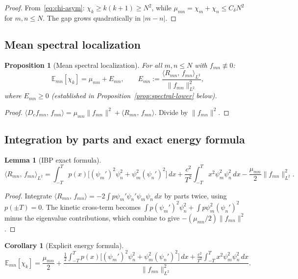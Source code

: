 \documentclass[12pt,a4paper]{amsart}
\newtheorem{lemma}[theorem]{Lemma}
\newtheorem{proposition}[theorem]{Proposition}
\newtheorem{corollary}[theorem]{Corollary}
\theoremstyle{definition}
\newcommand{\ip}[2]{\langle #1,\, #2\rangle}
\newcommand{\mumN}{\mu_{mn}}
\newcommand{\Emn}{\mathbb{E}_{mn}}
\begin{document}
\begin{proof}
From~\eqref{eq:chi-asym}: $\chi_k \ge k(k+1) \ge N^2$,
while $\mumN = \chi_m+\chi_n \le C_\delta N^2$ for $m,n \le N$.
The gap grows quadratically in $|m-n|$.
\end{proof}

\subsection{Mean spectral localization}

\begin{proposition}[Mean spectral localization]\label{prop:mean-loc}
For all $m,n \le N$ with $f_{mn}\not\equiv 0$:
\begin{equation}\label{eq:mean-loc}
  \Emn[\chi_k]
  = \mumN + E_{mn},
  \qquad
  E_{mn}
  := \frac{\ip{R_{mn}}{f_{mn}}_{L^2}}{\|f_{mn}\|_{L^2}^2},
\end{equation}
where $E_{mn} \ge 0$ (established in
Proposition~\ref{prop:spectral-lower} below).
\end{proposition}

\begin{proof}
$\ip{D_c f_{mn}}{f_{mn}} = \mumN\|f_{mn}\|^2 + \ip{R_{mn}}{f_{mn}}$.
Divide by $\|f_{mn}\|^2$.
\end{proof}

\subsection{Integration by parts and exact energy formula}

\begin{lemma}[IBP exact formula]\label{lem:ibp-exact}
\begin{equation}\label{eq:ibp-exact}
  \ip{R_{mn}}{f_{mn}}_{L^2}
  = \int_{-T}^T p(x)\bigl[(\psi_m')^2\psi_n^2 + \psi_m^2(\psi_n')^2\bigr]\,dx
  + \frac{c^2}{T^2}\int_{-T}^T x^2\psi_m^2\psi_n^2\,dx
  - \frac{\mumN}{2}\|f_{mn}\|_{L^2}^2.
\end{equation}
\end{lemma}

\begin{proof}
Integrate $\ip{R_{mn}}{f_{mn}} = -2\int p\psi_m'\psi_n'\psi_m\psi_n\,dx$
by parts twice, using $p(\pm T)=0$. The kinetic cross-term becomes
$\int p(\psi_m')^2\psi_n^2 + \int p\psi_m^2(\psi_n')^2$
minus the eigenvalue contributions, which combine to give
$-(\mumN/2)\|f_{mn}\|^2$.
\end{proof}

\begin{corollary}[Explicit energy formula]\label{cor:emn-explicit}
\begin{equation}\label{eq:emn-explicit}
  \Emn[\chi_k]
  = \frac{\mumN}{2}
  + \frac{
    \frac{1}{2}\int_{-T}^T p(x)\bigl[(\psi_m')^2\psi_n^2
      + \psi_m^2(\psi_n')^2\bigr]\,dx
    + \frac{c^2}{T^2}\int_{-T}^T x^2\psi_m^2\psi_n^2\,dx
    }{\|f_{mn}\|_{L^2}^2}.
\end{equation}
\end{corollary}
\end{document}
